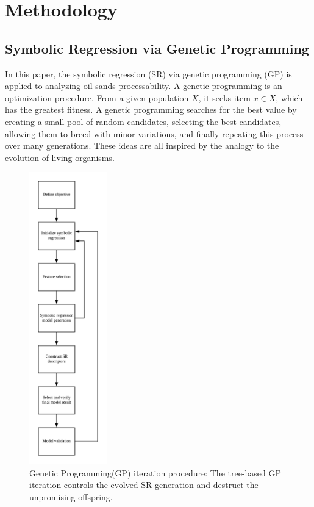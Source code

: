 \documentclass[final,5p,times,twocolumn]{elsarticle}
\begin{document}



\section{Methodology}

\subsection{Symbolic Regression via Genetic Programming}  


In this paper, the symbolic regression (SR) via genetic programming (GP) is applied to analyzing oil sands processability. 
A genetic programming is an optimization procedure. From a given population $X$, it seeks item $x \in X$, which has the greatest fitness. A genetic programming searches for the best value by creating a small pool of random candidates, selecting the best candidates, allowing them to breed with minor variations, and finally repeating this process over many generations. These ideas are all inspired by the analogy to the evolution of living organisms\cite{gen2000genetic}.


\begin{figure}[!htbp]
	\centering
	\includegraphics[width=0.3\textwidth]{B.png}
	\vspace{-2em}
	\caption{Genetic Programming(GP) iteration procedure: The tree-based GP iteration controls the evolved SR generation and destruct the unpromising offspring.}
	\label{fig:GP_procedure.png}
\end{figure}
\end{document}
